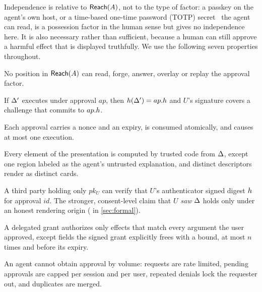 Independence is relative to $\mathsf{Reach}(A)$, not to the type of factor: a passkey on the agent's own host, or a time-based one-time password (TOTP)
secret~\citep{rfc6238} the agent can read, is a possession factor in the human sense but gives no independence here. It is also
necessary rather than sufficient, because a human can still approve a harmful effect that is displayed
truthfully. We use the following seven properties throughout.

\begin{property}\label{prop:p1}
No position in $\mathsf{Reach}(A)$ can read, forge, answer, overlay or replay the approval factor.
\end{property}
\begin{property}\label{prop:p2}
If $\Delta'$ executes under approval $ap$, then $h(\Delta')=ap.h$ and $U$'s signature covers a challenge that
commits to $ap.h$.
\end{property}
\begin{property}\label{prop:p3}
Each approval carries a nonce and an expiry, is consumed atomically, and causes at most one execution.
\end{property}
\begin{property}\label{prop:p4}
Every element of the presentation is computed by trusted code from $\Delta$, except one region labeled as the
agent's untrusted explanation, and distinct descriptors render as distinct cards.
\end{property}
\begin{property}\label{prop:p5}
A third party holding only $pk_U$ can verify that $U$'s authenticator signed digest $h$ for approval
$\mathit{id}$. The stronger, consent-level claim that $U$ \emph{saw} $\Delta$ holds only under an honest rendering
origin ( in \cref{sec:formal}).
\end{property}
\begin{property}\label{prop:p6}
A delegated grant authorizes only effects that match every argument the user approved, except fields the signed
grant explicitly frees with a bound, at most $n$ times and before its expiry.
\end{property}
\begin{property}\label{prop:p7}
An agent cannot obtain approval by volume: requests are rate limited, pending approvals are capped per session and
per user, repeated denials lock the requester out, and duplicates are merged.
\end{property}

